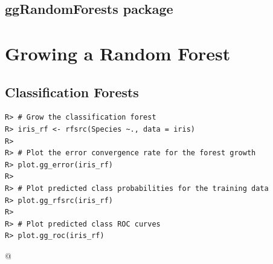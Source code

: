 \documentclass[nojss]{jss}\usepackage[]{graphicx}\usepackage[]{color}
\makeatletter
\newenvironment{kframe}{%
 \def\at@end@of@kframe{}%
 \ifinner\ifhmode%
  \def\at@end@of@kframe{\end{minipage}}%
  \begin{minipage}{\columnwidth}%
 \fi\fi%
 \def\FrameCommand##1{\hskip\@totalleftmargin \hskip-\fboxsep
 \colorbox{shadecolor}{##1}\hskip-\fboxsep
     \hskip-\linewidth \hskip-\@totalleftmargin \hskip\columnwidth}%
 \MakeFramed {\advance\hsize-\width
   \@totalleftmargin\z@ \linewidth\hsize
   \@setminipage}}%
 {\par\unskip\endMakeFramed%
 \at@end@of@kframe}
\newenvironment{knitrout}{}{} %
\makeatother
\begin{document}
\subsection{ggRandomForests package}



\section{Growing a Random Forest}

\subsection{Classification Forests}
\begin{knitrout}\footnotesize
{}\color{fgcolor}\begin{kframe}
\begin{verbatim}
R> # Grow the classification forest
R> iris_rf <- rfsrc(Species ~., data = iris)
R> 
R> # Plot the error convergence rate for the forest growth
R> plot.gg_error(iris_rf)
R> 
R> # Plot predicted class probabilities for the training data
R> plot.gg_rfsrc(iris_rf)
R> 
R> # Plot predicted class ROC curves
R> plot.gg_roc(iris_rf)
\end{verbatim}
\end{kframe}
\end{knitrout}

@

\end{document}
